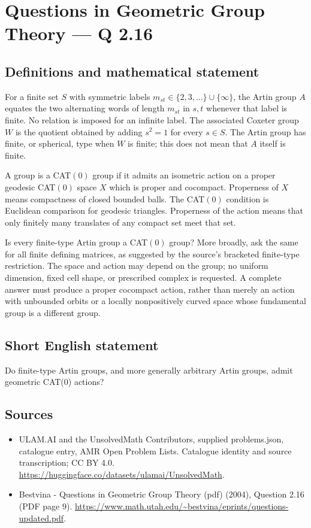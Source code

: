 \documentclass[11pt,a4paper]{article}
\begin{document}
\section*{Questions in Geometric Group Theory — Q 2.16}\label{statement}

\subsection{Definitions and mathematical statement}
For a finite set $S$ with symmetric labels $m_{st}\in\{2,3,\ldots\}\cup\{\infty\}$, the Artin group $A$ equates the two alternating words of length $m_{st}$ in $s,t$ whenever that label is finite. No relation is imposed for an infinite label. The associated Coxeter group $W$ is the quotient obtained by adding $s^2=1$ for every $s\in S$. The Artin group has finite, or spherical, type when $W$ is finite; this does not mean that $A$ itself is finite.

A group is a CAT$(0)$ group if it admits an isometric action on a proper geodesic CAT$(0)$ space $X$ which is proper and cocompact. Properness of $X$ means compactness of closed bounded balls. The CAT$(0)$ condition is Euclidean comparison for geodesic triangles. Properness of the action means that only finitely many translates of any compact set meet that set.

Is every finite-type Artin group a CAT$(0)$ group? More broadly, ask the same for all finite defining matrices, as suggested by the source's bracketed finite-type restriction. The space and action may depend on the group; no uniform dimension, fixed cell shape, or prescribed complex is requested. A complete answer must produce a proper cocompact action, rather than merely an action with unbounded orbits or a locally nonpositively curved space whose fundamental group is a different group.
\subsection{Short English statement}
Do finite-type Artin groups, and more generally arbitrary Artin groups, admit geometric CAT(0) actions?
\subsection{Sources}
\begin{itemize}
\item[S1] ULAM.AI and the UnsolvedMath Contributors, supplied problems.json, catalogue entry, AMR Open Problem Lists. Catalogue identity and source transcription; CC BY 4.0.
\url{https://huggingface.co/datasets/ulamai/UnsolvedMath}.
\item[S2] Bestvina - Questions in Geometric Group Theory (pdf) (2004), Question 2.16 (PDF page 9). 
\url{https://www.math.utah.edu/~bestvina/eprints/questions-updated.pdf}.
\end{itemize}
\end{document}

